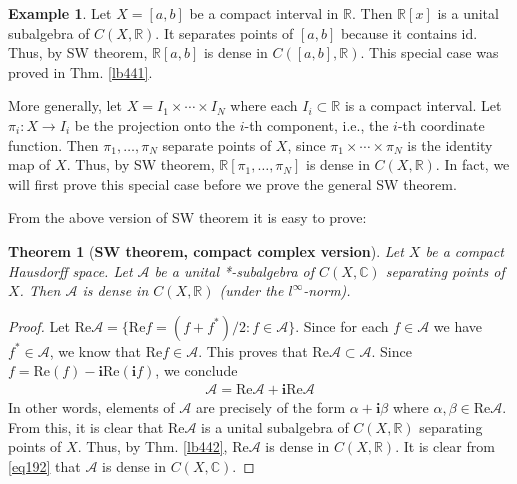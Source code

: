 \documentclass[12pt,b5paper,notitlepage]{article}
\theoremstyle{definition}
\newtheorem{eg}[df]{Example}
\theoremstyle{plain}
\newtheorem{thm}[df]{Theorem}
\newcommand{\id}{\mathrm{id}}
\newcommand{\scr}{\mathscr}
\newcommand{\im}{\mathbf{i}}
\newcommand{\Cbb}{\mathbb C}
\newcommand{\Rbb}{\mathbb R}
\newcommand{\Real}{\mathrm{Re}}
\numberwithin{equation}{section}
\begin{document}
\begin{eg}
Let $X=[a,b]$ be a compact interval in $\Rbb$. Then $\Rbb[x]$ is a unital subalgebra of $C(X,\Rbb)$. It separates points of $[a,b]$ because it contains $\id$. Thus, by SW theorem, $\Rbb[a,b]$ is dense in $C([a,b],\Rbb)$. This special case was proved in Thm. \ref{lb441}.

More generally, let $X=I_1\times\cdots\times I_N$ where each $I_i\subset\Rbb$ is a compact interval. Let $\pi_i:X\rightarrow I_i$ be the projection onto the $i$-th component, i.e., the $i$-th coordinate function. Then $\pi_1,\dots,\pi_N$ separate points of $X$, since $\pi_1\times\cdots\times\pi_N$ is the identity map of $X$. Thus, by SW theorem, $\Rbb[\pi_1,\dots,\pi_N]$ is dense in $C(X,\Rbb)$. In fact, we will first prove this special case before we prove the general SW theorem. \hfill\qedsymbol
\end{eg}

From the above version of SW theorem it is easy to prove:

\begin{thm}[\textbf{SW theorem, compact complex version}]\label{lb450}
Let $X$ be a compact Hausdorff space. Let $\scr A$ be a unital *-subalgebra of $C(X,\Cbb)$ separating points of $X$. Then $\scr A$ is dense in $C(X,\Rbb)$ (under the $l^\infty$-norm).
\end{thm}

\begin{proof}
Let $\Real\scr A=\{\Real f=(f+f^*)/2:f\in\scr A\}$. Since for each $f\in\scr A$ we have $f^*\in\scr A$, we know that $\Real f\in\scr A$. This proves that $\Real\scr A\subset\scr A$. Since $f=\Real( f)-\im\Real(\im f)$, we conclude
\begin{align}
\scr A=\Real\scr A+\im\Real\scr A  \label{eq192}
\end{align}
In other words, elements of $\scr A$ are precisely of the form $\alpha+\im\beta$ where $\alpha,\beta\in\Real\scr A$. From this, it is clear that $\Real\scr A$ is a unital subalgebra of $C(X,\Rbb)$ separating points of $X$. Thus, by Thm. \ref{lb442}, $\Real\scr A$ is dense in $C(X,\Rbb)$. It is clear from \eqref{eq192} that $\scr A$ is dense in $C(X,\Cbb)$.
\end{proof}
\end{document}
